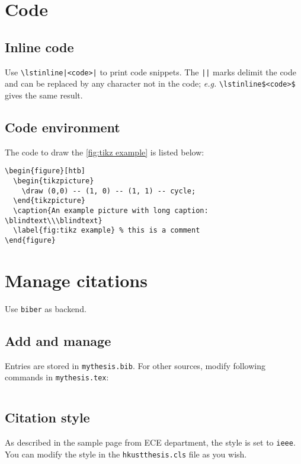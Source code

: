 \section{Code}

\subsection{Inline code}
Use \lstinline$\lstinline|<code>|$ to print code snippets. The \lstinline$||$ marks delimit
the code and can be replaced by any character not in the code;
\textit{e.g.}   \lstinline|\lstinline$<code>$| gives the same result.

\subsection{Code environment}
The code to draw the \cref{fig:tikz example} is listed below:
\begin{lstlisting}[caption={\hologo{LaTeX} code for inserting a figure}]
\begin{figure}[htb]
  \begin{tikzpicture}
    \draw (0,0) -- (1, 0) -- (1, 1) -- cycle;
  \end{tikzpicture}
  \caption{An example picture with long caption: \blindtext\\\blindtext}
  \label{fig:tikz example} % this is a comment
\end{figure}
\end{lstlisting}

\section{Manage citations}
\label{chap:bibliography}

Use \lstinline|biber| as  backend.

\subsection{Add and manage}

Entries are stored in \lstinline|mythesis.bib|. For other sources, modify following commands in \lstinline|mythesis.tex|:
\begin{lstlisting}[language=TeX]

\end{lstlisting}

\subsection{Citation style}

As described in the sample page from ECE department, the style is set to \lstinline|ieee|. You can modify the style in the \lstinline|hkustthesis.cls| file as you wish.
